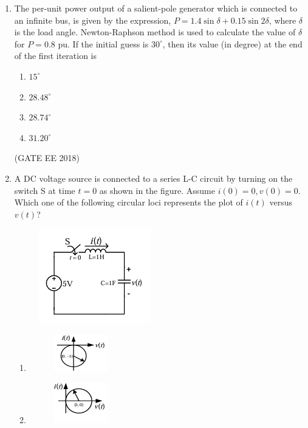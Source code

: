 \documentclass[journal,12pt,onecolumn]{IEEEtran}
\theoremstyle{remark}
\begin{document}
\begin{enumerate}
\item The per-unit power output of a salient-pole generator which is connected to an infinite bus, is given by the expression, $P = 1.4 \sin \delta + 0.15 \sin 2\delta$, where $\delta$ is the load angle. Newton-Raphson method is used to calculate the value of $\delta$ for $P = 0.8$ pu. If the initial guess is $30^\circ$, then its value (in degree) at the end of the first iteration is
\begin{multicols}{4}
\begin{enumerate}
    \item $15^\circ$
    \item $28.48^\circ$
    \item $28.74^\circ$
    \item $31.20^\circ$
\end{enumerate}
\end{multicols}
\hfill{(GATE EE 2018)}

\item A DC voltage source is connected to a series L-C circuit by turning on the switch S at time $t=0$ as shown in the figure. Assume $i(0)=0, v(0)=0$. Which one of the following circular loci represents the plot of $i(t)$ versus $v(t)$?
\begin{figure}[H]
    \centering
    \includegraphics[]{figs/Q.31.png}
    \caption{}
    \label{fig:10}
\end{figure}
\begin{multicols}{4}
\begin{enumerate}
    \item 
    \begin{figure}[H]
    \includegraphics[]{figs/Q.31-OPTION-1.png}
    \label{fig:11}
    \end{figure}
   
    \item 
    \begin{figure}[H]
    \includegraphics[]{figs/Q.31-OPTION-2.png}
    \label{fig:12}
    \end{figure}
   

\end{enumerate}
\end{multicols}
\end{enumerate}
\end{document}

